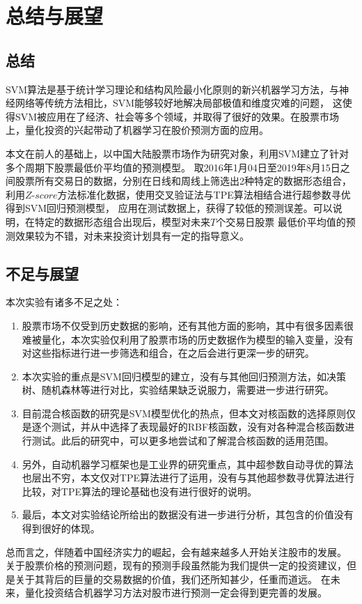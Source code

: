 \chapter{总结与展望}

\section{总结}

SVM算法是基于统计学习理论和结构风险最小化原则的新兴机器学习方法，与神经网络等传统方法相比，SVM能够较好地解决局部极值和维度灾难的问题，
这使得SVM被应用在了经济、社会等多个领域，并取得了很好的效果。在股票市场上，量化投资的兴起带动了机器学习在股价预测方面的应用。

本文在前人的基础上，以中国大陆股票市场作为研究对象，利用SVM建立了针对多个周期下股票最低价平均值的预测模型。
取2016年1月04日至2019年8月15日之间股票所有交易日的数据，分别在日线和周线上筛选出2种特定的数据形态组合，
利用$Z\text{-}score$方法标准化数据，使用交叉验证法与TPE算法相结合进行超参数寻优得到SVM回归预测模型，
应用在测试数据上，获得了较低的预测误差。可以说明，在特定的数据形态组合出现后，模型对未来$T$个交易日股票
最低价平均值的预测效果较为不错，对未来投资计划具有一定的指导意义。


\section{不足与展望}

本次实验有诸多不足之处：
\begin{enumerate}
    \item 股票市场不仅受到历史数据的影响，还有其他方面的影响，其中有很多因素很难被量化，本次实验仅利用了股票市场的历史数据作为模型的输入变量，没有对这些指标进行进一步筛选和组合，在之后会进行更深一步的研究。
    \item 本次实验的重点是SVM回归模型的建立，没有与其他回归预测方法，如决策树、随机森林等进行对比，实验结果缺乏说服力，需要进一步进行研究。
    \item 目前混合核函数的研究是SVM模型优化的热点，但本文对核函数的选择原则仅是逐个测试，并从中选择了表现最好的RBF核函数，没有对各种混合核函数进行测试。此后的研究中，可以更多地尝试和了解混合核函数的适用范围。
    \item 另外，自动机器学习框架也是工业界的研究重点，其中超参数自动寻优的算法也层出不穷，本文仅对TPE算法进行了运用，没有与其他超参数寻优算法进行比较，对TPE算法的理论基础也没有进行很好的说明。
    \item 最后，本文对实验结论所给出的数据没有进一步进行分析，其包含的价值没有得到很好的体现。
\end{enumerate}

总而言之，伴随着中国经济实力的崛起，会有越来越多人开始关注股市的发展。
关于股票价格的预测问题，现有的预测手段虽然能为我们提供一定的投资建议，但是关于其背后的巨量的交易数据的价值，我们还所知甚少，任重而道远。
在未来，量化投资结合机器学习方法对股市进行预测一定会得到更完善的发展。